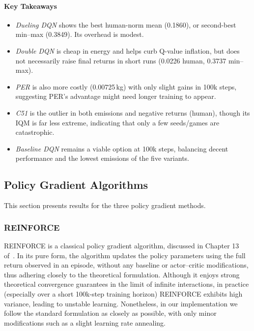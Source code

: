 \paragraph{Key Takeaways}
\begin{itemize}
	\item \emph{Dueling DQN} shows the best human-norm mean (\num{0.1860}), 
	or second-best min--max (\num{0.3849}). Its overhead is modest.
	\item \emph{Double DQN} is cheap in energy and helps curb Q-value inflation, 
	but does not necessarily raise final returns in short runs (\num{0.0226} human, \num{0.3737} min--max).
	\item \emph{PER} is also more costly (\num{0.00725}\,kg) with only slight gains in 100k steps, 
	suggesting PER's advantage might need longer training to appear.
	\item \emph{C51} is the outlier in both emissions and negative returns (human), 
	though its IQM is far less extreme, indicating that only a few seeds/games are catastrophic.
	\item \emph{Baseline DQN} remains a viable option at 100k steps, 
	balancing decent performance and the lowest emissions of the five variants.
\end{itemize}

\subsection{Policy Gradient Algorithms}
This section presents results for the three policy gradient methods.

\subsubsection{REINFORCE}
\label{subsubsec:reinforce}
REINFORCE is a classical policy gradient algorithm, discussed in Chapter 13 of~\cite{sutton:rl}. In its pure form, the algorithm updates the policy parameters using the full return observed in an episode, without any baseline or actor–critic modifications, thus adhering closely to the theoretical formulation. Although it enjoys strong theoretical convergence guarantees in the limit of infinite interactions, in practice (especially over a short 100k-step training horizon) REINFORCE exhibits high variance, leading to unstable learning. Nonetheless, in our implementation we follow the standard formulation as closely as possible, with only minor modifications such as a slight learning rate annealing. 

